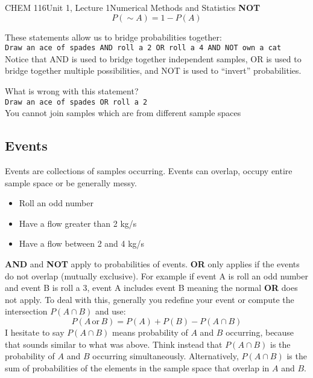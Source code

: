 \documentclass{article}
\begin{document}
\begin{tdoc}{CHEM 116}{Unit 1, Lecture 1}{Numerical Methods and Statistics}
{\bf NOT}\vspace{0.5cm}\\

\begin{equation}
P(\sim A) = 1 - P(A)
\end{equation}
\vspace{0.2cm}

These statements allow us to bridge probabilities together:\vspace{0.2cm}\\

\texttt{Draw an ace of spades AND roll a 2 OR roll a 4 AND NOT own a cat}\\

\vspace{0.2cm}Notice that AND is used to bridge together independent samples, OR is
used to bridge together multiple possibilities, and NOT is used to
``invert'' probabilities.\vspace{0.2cm}

What is wrong with this statement? \vspace{0.2cm}\\

\texttt{Draw an ace of spades OR roll a 2}\vspace{0.2cm}\\

You cannot join samples which are from different sample spaces

\subsection{Events}

Events are collections of samples occurring. Events can overlap, occupy
entire sample space or be generally messy.

\begin{itemize}

\item Roll an odd number
\item Have a flow greater than 2 kg/s
\item Have a flow between 2 and 4 kg/s

\end{itemize}
\vspace{0.5cm}

{\bf AND} and {\bf NOT} apply to probabilities of events. {\bf OR}
only applies if the events do not overlap (mutually exclusive). For
example if event A is roll an odd number and event B is roll a 3,
event A includes event B meaning the normal {\bf OR} does not
apply. To deal with this, generally you redefine your event or
compute the intersection $P(A\cap B)$ and use:
\begin{equation}
P(A\,\textrm{or}\,B) = P(A) + P(B) - P(A \cap B)
\end{equation}
I hesitate to say $P(A \cap B)$ means probability of $A$ and $B$
occurring, because that sounds similar to what was above. Think
instead that $P(A \cap B)$ is the probability of $A$ and $B$ occurring
simultaneously. Alternatively, $P(A \cap B)$ is the sum of
probabilities of the elements in the sample space that overlap in $A$
and $B$.


\end{tdoc}
\end{document}
